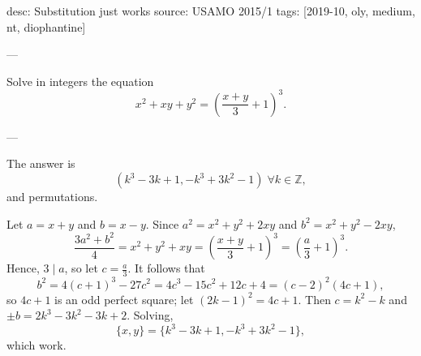 desc: Substitution just works
source: USAMO 2015/1
tags: [2019-10, oly, medium, nt, diophantine]

---

Solve in integers the equation \[x^2+xy+y^2=\left(\frac{x+y}3+1\right)^3.\]

---

The answer is \[\boxed{(k^3-3k+1,-k^3+3k^2-1)}\;\forall k\in\mathbb Z,\]
and permutations.

Let $a=x+y$ and $b=x-y$. Since $a^2=x^2+y^2+2xy$ and $b^2=x^2+y^2-2xy$, \[\frac{3a^2+b^2}4=x^2+y^2+xy=\left(\frac{x+y}3+1\right)^3=\left(\frac a3+1\right)^3.\]
Hence, $3\mid a$, so let $c=\tfrac a3$. It follows that \[b^2=4(c+1)^3-27c^2=4c^3-15c^2+12c+4=(c-2)^2(4c+1),\]
so $4c+1$ is an odd perfect square; let $(2k-1)^2=4c+1$. Then $c=k^2-k$ and $\pm b=2k^3-3k^2-3k+2$. Solving, \[\{x,y\}=\{k^3-3k+1,-k^3+3k^2-1\},\]
which work.
